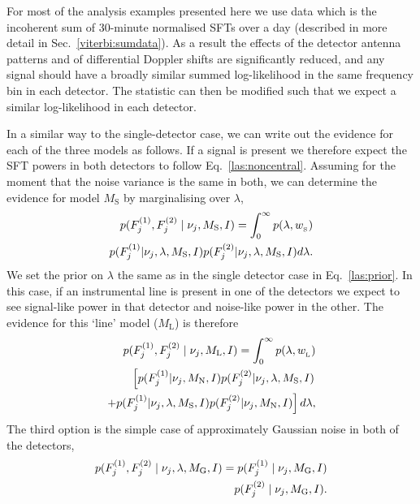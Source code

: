 %
%
For most of the analysis examples presented here we use data which is the incoherent sum of 30-minute normalised \acp{SFT} over a day (described in more detail in Sec.~\ref{viterbi:sumdata}). As a result the effects of the detector antenna patterns and of differential Doppler shifts are significantly reduced, and any signal should have a broadly similar summed log-likelihood in the same frequency bin in each detector. The statistic can then be modified such that we expect a similar log-likelihood in each detector.

In a similar way to the single-detector case, we can write out the evidence for each of the three models as follows. If a signal is present we therefore expect the \ac{SFT} powers in both detectors to follow Eq.~\ref{las:noncentral}.  Assuming for the moment that the noise variance is the same in both, we can determine the evidence for model $M_{\text{S}}$ by marginalising over $\lambda$,
%
\begin{equation}
\label{las:signal}
\begin{split}
p(F^{(1)}_{j},F^{(2)}_{j} \mid \nu_j,M_{\rm{S}},I) = \int_0^{\infty}  p(\lambda,w_{\rm_S}) \\
p(F^{(1)}_{j}|\nu_j,\lambda,M_{\text{S}},I)p(F^{(2)}_{j}|\nu_j,\lambda,M_{\text{S}},I) d\lambda.
\end{split}
\end{equation}
%
We set the prior on $\lambda$ the same as in the single detector case in Eq.~\ref{las:prior}.
In this case, if an instrumental line is present in one of the detectors we expect to see signal-like power in that detector and noise-like power in the other.  The evidence for this `line' model ($M_{\text{L}}$) is therefore
%
\begin{equation}
\label{las:line}
\begin{split}
p(F^{(1)}_{j},F^{(2)}_{j} \mid \nu_j,M_{\rm{L}},I) = \int_0^{\infty}  p(\lambda,w_{\rm_L}) \\
\left[ p(F^{(1)}_{j}|\nu_j,M_{\rm{N}},I)p(F^{(2)}_{j}|\nu_j,\lambda,M_{\rm{S}},I) \right. \\
\left. + p(F^{(1)}_{j}|\nu_j,\lambda,M_{\rm{S}},I)p(F^{(2)}_{j}|\nu_j,M_{\rm{N}},I)\right]d\lambda ,
\end{split}
\end{equation}
%
The third option is the simple case of approximately Gaussian noise in both of the detectors,
%
\begin{equation}
\label{las:noise}
\begin{split}
p(F^{(1)}_{j},F^{(2)}_{j} \mid \nu_j,\lambda,M_{\rm{G}},I) = p(F^{(1)}_{j} \mid \nu_j,M_{\rm{G}},I) \\
p(F^{(2)}_{j} \mid \nu_j,M_{\rm{G}},I) .
\end{split}
\end{equation}

